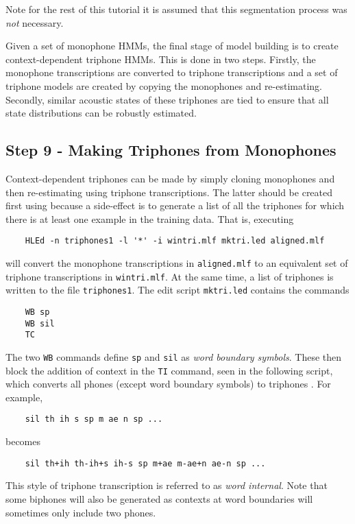 Note for the rest of this tutorial it is assumed that this segmentation
process was {\em not} necessary.


Given a set of monophone HMMs, the final stage of model building is to create
context-dependent triphone HMMs.  This is done in 
two steps.  Firstly, the
monophone transcriptions are converted to triphone transcriptions and a set
of triphone models are created by copying the monophones and re-estimating.
Secondly, similar acoustic states of these triphones are tied to ensure that
all state distributions can be robustly estimated.

\subsection{Step 9 - Making Triphones from Monophones}

Context-dependent triphones can be made by simply 
cloning monophones and then
re-estimating using triphone transcriptions.  The latter should be created
first using  because 
a side-effect is to generate a list of all
the triphones for which there is at least one example in the training data.
That is, executing
\begin{verbatim}
    HLEd -n triphones1 -l '*' -i wintri.mlf mktri.led aligned.mlf
\end{verbatim}
will convert the monophone transcriptions in \texttt{aligned.mlf} to
an equivalent set of triphone transcriptions in \texttt{wintri.mlf}.
At the same time, a list of triphones is written to the file \texttt{triphones1}.
The edit script \texttt{mktri.led}  contains the commands
\begin{verbatim}
    WB sp
    WB sil
    TC 
\end{verbatim}
The two \texttt{WB} commands define \texttt{sp} and \texttt{sil}
as \textit{word boundary symbols}.  These then block the addition of
context in the \texttt{TI} command, seen in the following script, which converts all phones
(except word boundary symbols) to triphones
.  
For example,
\begin{verbatim}
    sil th ih s sp m ae n sp ...
\end{verbatim}
becomes
\begin{verbatim}
    sil th+ih th-ih+s ih-s sp m+ae m-ae+n ae-n sp ...
\end{verbatim}
This style of triphone transcription is referred to as \textit{word internal}.
Note that some biphones will also be generated as contexts at word boundaries
will sometimes only include two phones.

